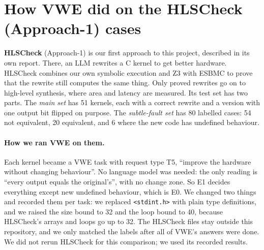 \documentclass[10pt,a4paper]{article}
\begin{document}
\section{How VWE did on the HLSCheck (Approach-1) cases}
\label{sec:approach1}
\textbf{HLSCheck} (Approach-1) is our first approach to this project, described in its own report.
There, an LLM rewrites a C kernel to get better hardware. HLSCheck combines our own symbolic
execution and Z3 with ESBMC to prove that the rewrite still computes the same thing. Only proved
rewrites go on to high-level synthesis, where area and latency are measured. Its test set
has two parts. The \emph{main set} has 51 kernels, each with a correct rewrite and a version with
one output bit flipped on purpose. The \emph{subtle-fault set} has 80 labelled cases:
54 not equivalent, 20 equivalent, and 6 where the new code has undefined behaviour.

\paragraph{How we ran VWE on them.} Each kernel became a VWE task with request type T5, ``improve the
hardware without changing behaviour''. No language model was needed: the only reading is ``every
output equals the original's'', with no change zone. So E1 decides everything except new undefined
behaviour, which is E0. We changed two things and recorded them per task: we replaced
\texttt{<stdint.h>} with plain type definitions, and we raised the size bound to 32 and the loop
bound to 40, because HLSCheck's arrays and loops go up to 32. The HLSCheck files stay outside this repository,
and we only matched the labels after all of VWE's answers were done. We did not rerun HLSCheck
for this comparison; we used its recorded results.

\begin{center}
\end{center}
\end{document}
